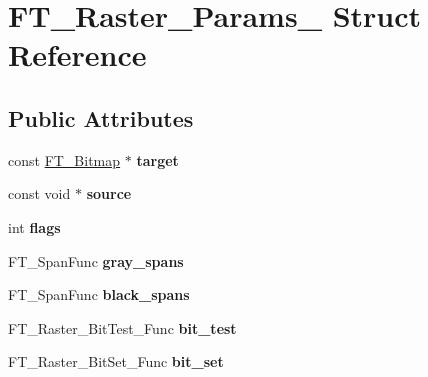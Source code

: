 \hypertarget{struct_f_t___raster___params__}{}\section{F\+T\+\_\+\+Raster\+\_\+\+Params\+\_\+ Struct Reference}
\label{struct_f_t___raster___params__}
\subsection*{Public Attributes}
\begin{DoxyCompactItemize}
\item 
const \hyperlink{struct_f_t___bitmap__}{F\+T\+\_\+\+Bitmap} $\ast$ {\bfseries target}\hypertarget{struct_f_t___raster___params___a2ba8941740db23ec91302aa9bd154da3}{}\label{struct_f_t___raster___params___a2ba8941740db23ec91302aa9bd154da3}

\item 
const void $\ast$ {\bfseries source}\hypertarget{struct_f_t___raster___params___a9be95865384791b018f7a9665a062ee5}{}\label{struct_f_t___raster___params___a9be95865384791b018f7a9665a062ee5}

\item 
int {\bfseries flags}\hypertarget{struct_f_t___raster___params___a1a28ab69b8296b4378886d1a2b57d333}{}\label{struct_f_t___raster___params___a1a28ab69b8296b4378886d1a2b57d333}

\item 
F\+T\+\_\+\+Span\+Func {\bfseries gray\+\_\+spans}\hypertarget{struct_f_t___raster___params___a456191f1944775933e3d9d36c8632c35}{}\label{struct_f_t___raster___params___a456191f1944775933e3d9d36c8632c35}

\item 
F\+T\+\_\+\+Span\+Func {\bfseries black\+\_\+spans}\hypertarget{struct_f_t___raster___params___a42c30e60ad5e243cf78833232e052b47}{}\label{struct_f_t___raster___params___a42c30e60ad5e243cf78833232e052b47}

\item 
F\+T\+\_\+\+Raster\+\_\+\+Bit\+Test\+\_\+\+Func {\bfseries bit\+\_\+test}\hypertarget{struct_f_t___raster___params___aff3c1a2a7eda24136a46715128d24ed6}{}\label{struct_f_t___raster___params___aff3c1a2a7eda24136a46715128d24ed6}

\item 
F\+T\+\_\+\+Raster\+\_\+\+Bit\+Set\+\_\+\+Func {\bfseries bit\+\_\+set}\hypertarget{struct_f_t___raster___params___ac66c3c44fcb63c254a46170d85d653c0}{}\label{struct_f_t___raster___params___ac66c3c44fcb63c254a46170d85d653c0}


\end{DoxyCompactItemize}
